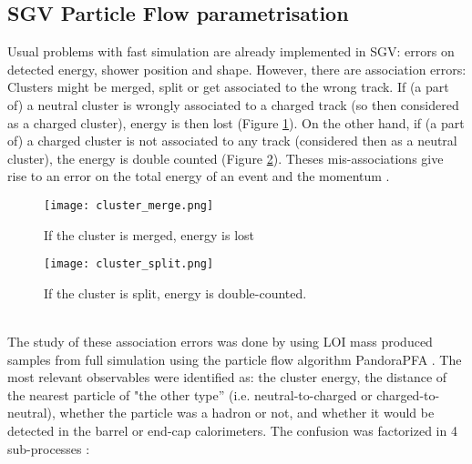 \documentclass[a4paper,12pt]{article}
\begin{document}
\subsection{SGV Particle Flow parametrisation}
\label{sec:sgv_pflow}

Usual problems with fast simulation are already implemented in SGV: errors on detected energy, shower position and shape. However, there are association errors: Clusters might be merged, split or get associated to the wrong track. If (a part of) a neutral cluster is wrongly associated to a charged track (so then considered as a charged cluster), energy is then lost (Figure \ref{fig:asso_errors}). On the other hand, if (a part of) a charged cluster is not associated to any track (considered then as a neutral cluster), the energy is double counted (Figure \ref{fig:asso_errors2}). Theses mis-associations give rise to an error on the total energy of an event and the momentum \cite{Madalina}.

\noindent
\begin{minipage}{\linewidth}
\centering
\begin{minipage}{0.4\linewidth}
\begin{figure}[H]
   \texttt{[image: cluster\_merge.png]} 
    \caption{If the cluster is merged, energy is lost}
    \label{fig:asso_errors}
\end{figure}
\end{minipage}
      \hspace{0.05\linewidth}
      \begin{minipage}{0.4\linewidth}
\begin{figure}[H]
    \texttt{[image: cluster\_split.png]} 
      \caption{If the cluster is split, energy is double-counted.}
   \label{fig:asso_errors2}
\end{figure}
\end{minipage}
\end{minipage}\\[0.4cm]

\noindent
The study of these association errors was done by using LOI mass produced samples from full simulation using the particle flow algorithm PandoraPFA  \cite{Thomson}. The most relevant observables were identified as: the cluster energy, the distance of the nearest particle of "the other type'' (i.e. neutral-to-charged or charged-to-neutral), whether the particle was a hadron or not, and whether it would be detected in the barrel or end-cap calorimeters.
The confusion was factorized in 4 sub-processes \cite{Berggren}:
\end{document}
